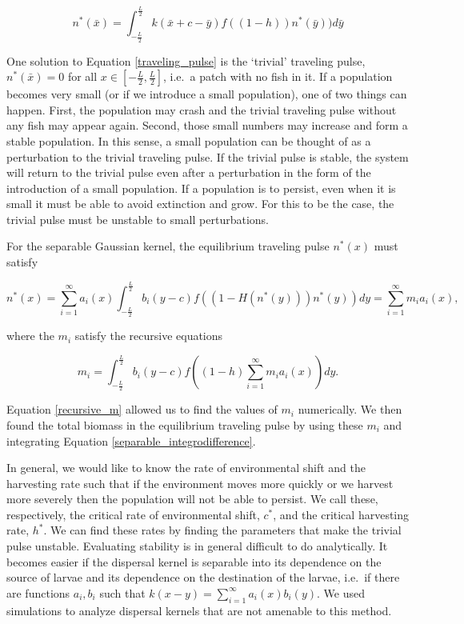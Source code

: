 \documentclass[]{article}
\begin{document}
\begin{equation}
n^*(\bar{x})=\int^{\frac{L}{2}}_{-\frac{L}{2}}k(\bar{x}+c-\bar{y})f((1-h))n^*(\bar{y}))d
\bar{y} \label{traveling_pulse}
\end{equation}

One solution to Equation \ref{traveling_pulse} is the `trivial' traveling pulse, $n^*(\bar{x}) = 0$ for all $x \in \left[-\frac{L}
{2}, \frac{L}{2}\right]$, i.e.~a patch with no fish in it. If a population becomes very small (or if we introduce a small 
population), one of two things can happen. First, the population may crash and the trivial traveling pulse 
without any fish may appear again. Second, those small numbers may increase and form a stable population. 
In this sense, a small population can be thought of as a perturbation to the trivial traveling pulse. If the trivial 
pulse is stable, the system will return to the trivial pulse even after a perturbation in the form of the introduction 
of a small population. If a population is to persist, even when it is small it must be able to avoid extinction and 
grow. For this to be the case, the trivial pulse must be unstable to small perturbations.  

For the separable Gaussian kernel, the equilibrium traveling pulse $n^*(x)$ must satisfy

\begin{equation}
n^*(x)=\sum^\infty_{i=1}
a_i(x)\int^{\frac{L}{2}}_{-\frac{L}{2}}b_i(y-c)f((1-H(n^*(y)))n^*(y))dy=\sum^\infty_{i=1}m_ia_i(x), \label{separable_integrodifference}
\end{equation}

\noindent where the $m_i$ satisfy the recursive equations

\begin{equation}
m_i=\int^{\frac{L}{2}}_{-\frac{L}{2}}b_i(y-c)f\left((1-h)\sum^\infty_{i=1}m_ia_i(x)\right)
dy. \label{recursive_m}
\end{equation}

\noindent Equation \ref{recursive_m} allowed us to find the values of $m_i$ numerically. We then found the total biomass in the 
equilibrium traveling pulse by using these $m_i$ and integrating Equation \ref{separable_integrodifference}.

In general, we would like to know the rate of environmental shift and the harvesting rate such that if the 
environment moves more quickly or we harvest more severely then the population will not be able to persist. 
We call these, respectively, the critical rate of environmental shift, $c^*$, and the critical harvesting rate, $h^*$. 
We can find these rates by finding the parameters that make the trivial pulse unstable. Evaluating stability is in 
general difficult to do analytically. It becomes easier if the dispersal kernel is separable into its dependence on the 
source of larvae and its dependence on the destination of the larvae,
i.e.~if there are functions $a_i, b_i$ such that $k(x- y) = \sum^\infty_{i=1} a_i(x)b_i(y)$. We used 
simulations to analyze dispersal kernels that are not amenable to this method.
\end{document}

